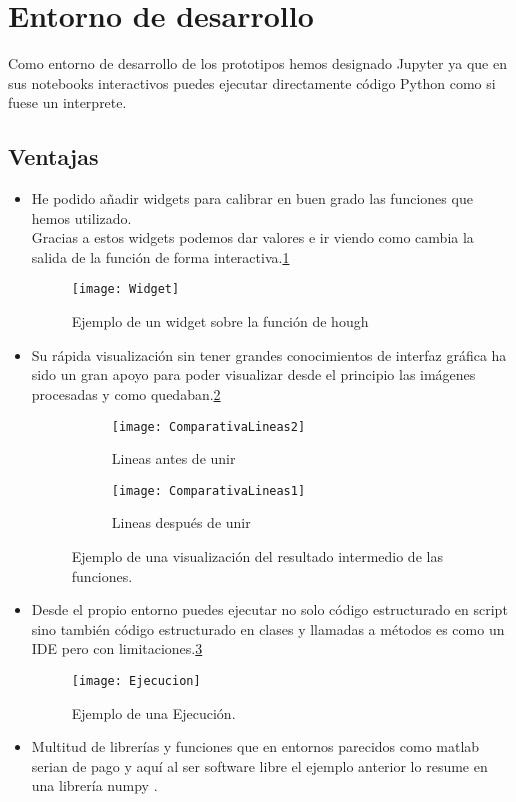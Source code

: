 
\section{Entorno de desarrollo}
Como entorno de desarrollo de los prototipos hemos designado Jupyter ya que en sus notebooks interactivos puedes ejecutar directamente código Python como si fuese un interprete.

\subsection{Ventajas}
\begin{itemize}
\item He podido añadir widgets para calibrar en buen grado las funciones que hemos utilizado.\\
Gracias a estos widgets podemos dar valores e ir viendo como cambia la salida de la función de forma interactiva.\ref{fig:5.1}

\begin{figure}[h]
\centering
\texttt{[image: Widget]}
\caption{Ejemplo de un widget sobre la función de hough}
\label{fig:5.1}
\end{figure}

\item Su rápida visualización sin tener grandes conocimientos de interfaz gráfica ha sido un gran apoyo para poder visualizar desde el principio las imágenes procesadas y como quedaban.\ref{fig:5.2} 

\begin{figure}
\begin{subfigure}[b]{.5\linewidth}
\centering\large \texttt{[image: ComparativaLineas2]}
\caption{Lineas antes de unir}
\end{subfigure}%
\begin{subfigure}[b]{.5\linewidth}
\centering\large \texttt{[image: ComparativaLineas1]}
\caption{Lineas después de unir}
\end{subfigure}
\caption{Ejemplo de una visualización del resultado intermedio de las funciones.}\label{fig:5.2}
\end{figure}


\item Desde el propio entorno puedes ejecutar no solo código estructurado en script sino también código estructurado en clases y llamadas a métodos es como un IDE pero con limitaciones.\ref{fig:5.3}

\begin{figure}[h]
\centering
\texttt{[image: Ejecucion]}
\caption{Ejemplo de una Ejecución.}
\label{fig:5.3}
\end{figure}

\item Multitud de librerías y funciones que en entornos parecidos como matlab serian de pago y aquí al ser software libre el ejemplo anterior lo resume en una librería numpy \cite{Numpy}.
\end{itemize}

